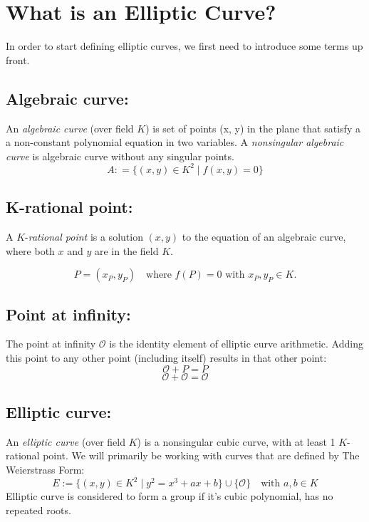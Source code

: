 \documentclass[bp,en]{FEIstyle}
\newcommand{\point}[1]{
#1 = (x_{#1}, y_{#1})
}
\begin{document}
\section*{What is an Elliptic Curve?}
In order to start defining elliptic curves, we first need to introduce some terms up front.
\subsection*{Algebraic curve:}
An \textit{algebraic curve} (over field $K$) is set of points (x, y) in the plane that satisfy a a non-constant polynomial equation in two variables. A \textit{nonsingular algebraic curve} is algebraic curve without any singular points.
\[
A: = \{ (x,y) \in K^2 \mid f(x, y) = 0\}  
\]
\subsection*{K-rational point:}
A \( K \)-\textit{rational point} is a solution \( (x, y) \) to the equation of an algebraic curve, where both \( x \) and \( y \) are in the field \( K \). 

\[
\point{P} \quad \text{where } f(P) = 0 \text{ with } x_{P}, y_{P} \in K.
\]

\subsection*{Point at infinity:}
The point at infinity $\mathcal{O}$ is the identity element of elliptic curve arithmetic. Adding this point to any other point (including itself) results in that other point:
\[
\mathcal{O} + P = P 
\]
\[
\mathcal{O} + \mathcal{O} = \mathcal{O} 
\]
\subsection*{Elliptic curve:}
An \textit{elliptic curve} (over field $K$) is a nonsingular cubic curve, with at least 1 $K$-rational point. We will primarily be working with curves that are defined by The Weierstrass Form:
\[
E := \{ (x,y) \in K^2 \mid y^2 = x^3 + ax + b \} \cup \{ \mathcal{O} 
\} \quad \text{with } a, b \in K
\]
Elliptic curve is considered to form a group if it's cubic polynomial, has no repeated roots.
\newpage
\end{document}
